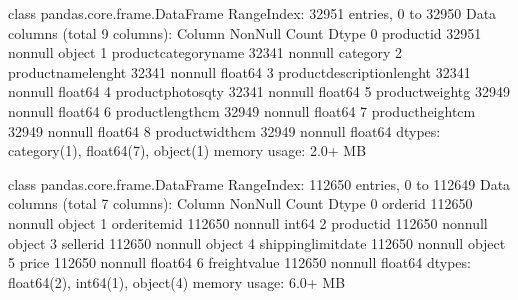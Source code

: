 \documentclass[letterpaper,10pt,english]{jupyterBook}
\begin{document}
\begin{sphinxVerbatim}[commandchars=\\\{\}]
\PYGZlt{}class \PYGZsq{}pandas.core.frame.DataFrame\PYGZsq{}\PYGZgt{}
RangeIndex: 32951 entries, 0 to 32950
Data columns (total 9 columns):
 \PYGZsh{}   Column                      Non\PYGZhy{}Null Count  Dtype   
\PYGZhy{}\PYGZhy{}\PYGZhy{}  \PYGZhy{}\PYGZhy{}\PYGZhy{}\PYGZhy{}\PYGZhy{}\PYGZhy{}                      \PYGZhy{}\PYGZhy{}\PYGZhy{}\PYGZhy{}\PYGZhy{}\PYGZhy{}\PYGZhy{}\PYGZhy{}\PYGZhy{}\PYGZhy{}\PYGZhy{}\PYGZhy{}\PYGZhy{}\PYGZhy{}  \PYGZhy{}\PYGZhy{}\PYGZhy{}\PYGZhy{}\PYGZhy{}   
 0   product\PYGZus{}id                  32951 non\PYGZhy{}null  object  
 1   product\PYGZus{}category\PYGZus{}name       32341 non\PYGZhy{}null  category
 2   product\PYGZus{}name\PYGZus{}lenght         32341 non\PYGZhy{}null  float64 
 3   product\PYGZus{}description\PYGZus{}lenght  32341 non\PYGZhy{}null  float64 
 4   product\PYGZus{}photos\PYGZus{}qty          32341 non\PYGZhy{}null  float64 
 5   product\PYGZus{}weight\PYGZus{}g            32949 non\PYGZhy{}null  float64 
 6   product\PYGZus{}length\PYGZus{}cm           32949 non\PYGZhy{}null  float64 
 7   product\PYGZus{}height\PYGZus{}cm           32949 non\PYGZhy{}null  float64 
 8   product\PYGZus{}width\PYGZus{}cm            32949 non\PYGZhy{}null  float64 
dtypes: category(1), float64(7), object(1)
memory usage: 2.0+ MB
\end{sphinxVerbatim}

\begin{sphinxVerbatim}[commandchars=\\\{\}]
\end{sphinxVerbatim}

\begin{sphinxVerbatim}[commandchars=\\\{\}]
\PYGZlt{}class \PYGZsq{}pandas.core.frame.DataFrame\PYGZsq{}\PYGZgt{}
RangeIndex: 112650 entries, 0 to 112649
Data columns (total 7 columns):
 \PYGZsh{}   Column               Non\PYGZhy{}Null Count   Dtype  
\PYGZhy{}\PYGZhy{}\PYGZhy{}  \PYGZhy{}\PYGZhy{}\PYGZhy{}\PYGZhy{}\PYGZhy{}\PYGZhy{}               \PYGZhy{}\PYGZhy{}\PYGZhy{}\PYGZhy{}\PYGZhy{}\PYGZhy{}\PYGZhy{}\PYGZhy{}\PYGZhy{}\PYGZhy{}\PYGZhy{}\PYGZhy{}\PYGZhy{}\PYGZhy{}   \PYGZhy{}\PYGZhy{}\PYGZhy{}\PYGZhy{}\PYGZhy{}  
 0   order\PYGZus{}id             112650 non\PYGZhy{}null  object 
 1   order\PYGZus{}item\PYGZus{}id        112650 non\PYGZhy{}null  int64  
 2   product\PYGZus{}id           112650 non\PYGZhy{}null  object 
 3   seller\PYGZus{}id            112650 non\PYGZhy{}null  object 
 4   shipping\PYGZus{}limit\PYGZus{}date  112650 non\PYGZhy{}null  object 
 5   price                112650 non\PYGZhy{}null  float64
 6   freight\PYGZus{}value        112650 non\PYGZhy{}null  float64
dtypes: float64(2), int64(1), object(4)
memory usage: 6.0+ MB
\end{sphinxVerbatim}
\end{document}
